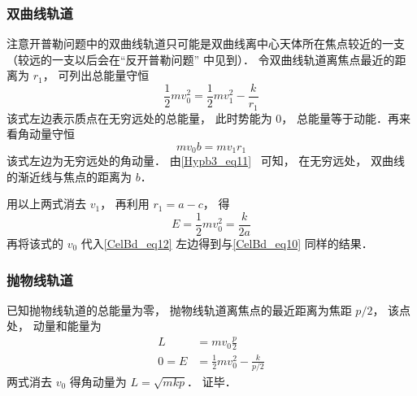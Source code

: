 \subsubsection{双曲线轨道}
注意开普勒问题中的双曲线轨道只可能是双曲线离中心天体所在焦点较近的一支（较远的一支以后会在“反开普勒问题” 中见到）． 令双曲线轨道离焦点最近的距离为 $r_1$， 可列出总能量守恒
\begin{equation}\label{CelBd_eq11}
\frac12 mv_0^2 = \frac12 mv_1^2 - \frac{k}{r_1}
\end{equation}
该式左边表示质点在无穷远处的总能量， 此时势能为 $0$， 总能量等于动能．再来看角动量守恒
\begin{equation}\label{CelBd_eq12}
m v_0 b = m v_1 r_1
\end{equation}
该式左边为无穷远处的角动量． 由\autoref{Hypb3_eq11}~ 可知， 在无穷远处， 双曲线的渐近线与焦点的距离为 $b$．

用以上两式消去 $v_1$， 再利用 $r_1 = a - c$， 得
\begin{equation}\label{CelBd_eq13}
E = \frac 12 m v_0^2 = \frac{k}{2a}
\end{equation}
再将该式的 $v_0$ 代入\autoref{CelBd_eq12} 左边得到与\autoref{CelBd_eq10} 同样的结果．

\subsubsection{抛物线轨道}
已知抛物线轨道的总能量为零， 抛物线轨道离焦点的最近距离为焦距 $p/2$， 该点处， 动量和能量为
\begin{align}
L &= mv_0 \frac p2\\
0 = E &= \frac 12 mv_0^2 - \frac{k}{p/2}
\end{align}
两式消去 $v_0$ 得角动量为 $L = \sqrt{mkp}$． 证毕．
